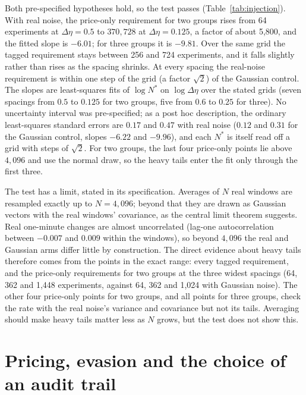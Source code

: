 \documentclass[12pt]{article}
\theoremstyle{definition}
\theoremstyle{remark}
\begin{document}
Both pre-specified hypotheses hold, so the test passes (Table~\ref{tab:injection}). With real noise, the price-only requirement for two groups rises from 64 experiments at $\Delta\eta=0.5$ to $370{,}728$ at $\Delta\eta=0.125$, a factor of about 5{,}800, and the fitted slope is $-6.01$; for three groups it is $-9.81$. Over the same grid the tagged requirement stays between 256 and 724 experiments, and it falls slightly rather than rises as the spacing shrinks. At every spacing the real-noise requirement is within one step of the grid (a factor $\sqrt2$) of the Gaussian control. The slopes are least-squares fits of $\log N^*$ on $\log\Delta\eta$ over the stated grids (seven spacings from $0.5$ to $0.125$ for two groups, five from $0.6$ to $0.25$ for three). No uncertainty interval was pre-specified; as a post hoc description, the ordinary least-squares standard errors are $0.17$ and $0.47$ with real noise ($0.12$ and $0.31$ for the Gaussian control, slopes $-6.22$ and $-9.96$), and each $N^*$ is itself read off a grid with steps of $\sqrt2$. For two groups, the last four price-only points lie above $4{,}096$ and use the normal draw, so the heavy tails enter the fit only through the first three.

The test has a limit, stated in its specification. Averages of $N$ real windows are resampled exactly up to $N=4{,}096$; beyond that they are drawn as Gaussian vectors with the real windows' covariance, as the central limit theorem suggests. Real one-minute changes are almost uncorrelated (lag-one autocorrelation between $-0.007$ and $0.009$ within the windows), so beyond $4{,}096$ the real and Gaussian arms differ little by construction. The direct evidence about heavy tails therefore comes from the points in the exact range: every tagged requirement, and the price-only requirements for two groups at the three widest spacings (64, 362 and 1{,}448 experiments, against 64, 362 and 1{,}024 with Gaussian noise). The other four price-only points for two groups, and all points for three groups, check the rate with the real noise's variance and covariance but not its tails. Averaging should make heavy tails matter less as $N$ grows, but the test does not show this.

\section{Pricing, evasion and the choice of an audit trail}\label{app:restored_policy}
\end{document}
